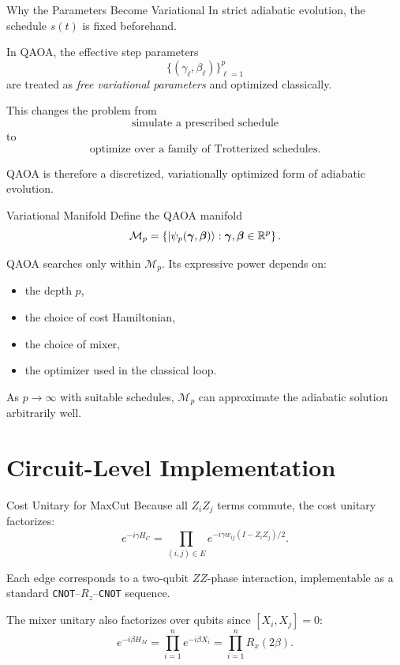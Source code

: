 \documentclass[aspectratio=169]{beamer}
\begin{document}
\begin{frame}{Why the Parameters Become Variational}
In strict adiabatic evolution, the schedule \(s(t)\) is fixed beforehand.

In QAOA, the effective step parameters
\[
\{(\gamma_\ell,\beta_\ell)\}_{\ell=1}^p
\]
are treated as \emph{free variational parameters} and optimized classically.

This changes the problem from
\[
\text{simulate a prescribed schedule}
\]
to
\[
\text{optimize over a family of Trotterized schedules}.
\]

QAOA is therefore a discretized, variationally optimized form of adiabatic
evolution.
\end{frame}

\begin{frame}{Variational Manifold}
Define the QAOA manifold
\[
\mathcal{M}_p
=
\left\{
\ket{\psi_p(\bm{\gamma},\bm{\beta})}
:
\bm{\gamma},\bm{\beta}\in\mathbb{R}^p
\right\}.
\]

QAOA searches only within \(\mathcal{M}_p\). Its expressive power depends on:
\begin{itemize}
    \item the depth \(p\),
    \item the choice of cost Hamiltonian,
    \item the choice of mixer,
    \item the optimizer used in the classical loop.
\end{itemize}

As \(p\to\infty\) with suitable schedules, \(\mathcal{M}_p\) can approximate the
adiabatic solution arbitrarily well.
\end{frame}

\section{Circuit-Level Implementation}

\begin{frame}{Cost Unitary for MaxCut}
Because all \(Z_iZ_j\) terms commute, the cost unitary factorizes:
\[
e^{-i\gamma H_C}
=
\prod_{(i,j)\in E}
e^{-i\gamma w_{ij}(I-Z_iZ_j)/2}.
\]

Each edge corresponds to a two-qubit \(ZZ\)-phase interaction, implementable as
a standard \texttt{CNOT}--\(R_z\)--\texttt{CNOT} sequence.

The mixer unitary also factorizes over qubits since \([X_i,X_j]=0\):
\[
e^{-i\beta H_M}
=
\prod_{i=1}^n e^{-i\beta X_i}
=
\prod_{i=1}^n R_x(2\beta).
\]
\end{frame}
\end{document}
